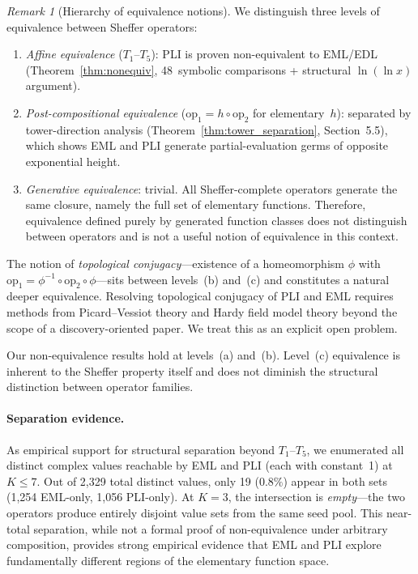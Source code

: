 \documentclass[10pt,twocolumn]{article}
\theoremstyle{remark}
\newtheorem*{remark}{Remark}
\begin{document}
\begin{remark}[Hierarchy of equivalence notions]
\label{rem:equiv_hierarchy}
We distinguish three levels of equivalence between Sheffer operators:
\begin{enumerate}
\item[(a)] \emph{Affine equivalence} ($T_1$--$T_5$): PLI is proven non-equivalent to EML/EDL (Theorem~\ref{thm:nonequiv}, 48~symbolic comparisons + structural $\ln(\ln x)$ argument).
\item[(b)] \emph{Post-compositional equivalence} ($\mathrm{op}_1 = h \circ \mathrm{op}_2$ for elementary~$h$): separated by tower-direction analysis (Theorem~\ref{thm:tower_separation}, Section~5.5), which shows EML and PLI generate partial-evaluation germs of opposite exponential height.
\item[(c)] \emph{Generative equivalence}: trivial. All Sheffer-complete operators generate the same closure, namely the full set of elementary functions. Therefore, equivalence defined purely by generated function classes does not distinguish between operators and is not a useful notion of equivalence in this context.
\end{enumerate}

\smallskip
\noindent The notion of \emph{topological conjugacy}---existence of a homeomorphism $\phi$ with $\mathrm{op}_1 = \phi^{-1} \circ \mathrm{op}_2 \circ \phi$---sits between levels~(b) and~(c) and constitutes a natural deeper equivalence. Resolving topological conjugacy of PLI and EML requires methods from Picard--Vessiot theory and Hardy field model theory beyond the scope of a discovery-oriented paper. We treat this as an explicit open problem.

\smallskip
Our non-equivalence results hold at levels~(a) and~(b). Level~(c) equivalence is inherent to the Sheffer property itself and does not diminish the structural distinction between operator families.
\end{remark}

\paragraph{Separation evidence.} As empirical support for structural separation beyond $T_1$--$T_5$, we enumerated all distinct complex values reachable by EML and PLI (each with constant~1) at $K \leq 7$. Out of 2{,}329 total distinct values, only 19 ($0.8\%$) appear in both sets (1{,}254 EML-only, 1{,}056 PLI-only). At $K{=}3$, the intersection is \emph{empty}---the two operators produce entirely disjoint value sets from the same seed pool. This near-total separation, while not a formal proof of non-equivalence under arbitrary composition, provides strong empirical evidence that EML and PLI explore fundamentally different regions of the elementary function space.
\end{document}
